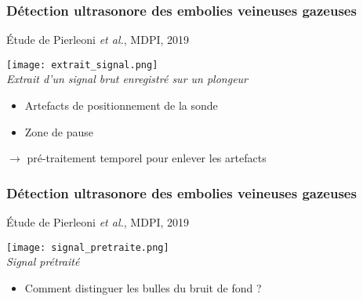 \documentclass{beamer}
\begin{document}
\begin{frame}
\frametitle{Détection ultrasonore des embolies veineuses gazeuses}
\'Etude de Pierleoni \textit{et al.}, MDPI, 2019

\begin{center}
\texttt{[image: extrait\_signal.png]}\\
\textit{\footnotesize Extrait d'un signal brut enregistré sur un plongeur}
\end{center}


\begin{itemize}
\item Artefacts de positionnement de la sonde  
\vspace{0.1cm}
\item Zone de pause 
\vspace{0.1cm}
\end{itemize}

$\rightarrow$ pré-traitement temporel pour enlever les artefacts

\end{frame}

\begin{frame}
\frametitle{Détection ultrasonore des embolies veineuses gazeuses}
\'Etude de Pierleoni \textit{et al.}, MDPI, 2019

\begin{center}
\texttt{[image: signal\_pretraite.png]}\\
\textit{\footnotesize Signal prétraité}
\end{center}


\begin{itemize}
\item Comment distinguer les bulles du bruit de fond ?  
\end{itemize}

\end{frame}
\end{document}
